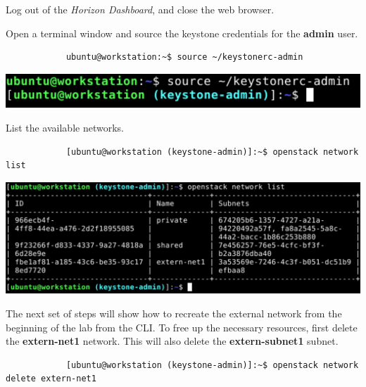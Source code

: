 \documentclass[letterpaper, 12pt]{article}
\begin{document}
\begin{enumerate}
    \begin{labstep}
        Log out of the \textit{Horizon Dashboard}, and close the web browser.
    \end{labstep}

    \begin{labstep}
        Open a terminal window and source the keystone credentials for the \textbf{admin} user.
        \begin{lstlisting}
            ubuntu@workstation:~$ source ~/keystonerc-admin
        \end{lstlisting}

        \begin{center}
            \includegraphics[width=\linewidth]{images/part1/step11.png}
        \end{center}
    \end{labstep}

    \begin{labstep}
        List the available networks.
        \begin{lstlisting}
            [ubuntu@workstation (keystone-admin)]:~$ openstack network list
        \end{lstlisting}

        \begin{center}
            \includegraphics[width=\linewidth]{images/part1/step12.png}
        \end{center}
    \end{labstep}

    \begin{labstep}
        The next set of steps will show how to recreate the external network from the beginning of the lab from the CLI.
        To free up the necessary resources, first delete the \textbf{extern-net1} network.
        This will also delete the \textbf{extern-subnet1} subnet.
        \begin{lstlisting}
            [ubuntu@workstation (keystone-admin)]:~$ openstack network delete extern-net1
        \end{lstlisting}


\end{labstep}
\end{enumerate}
\end{document}
